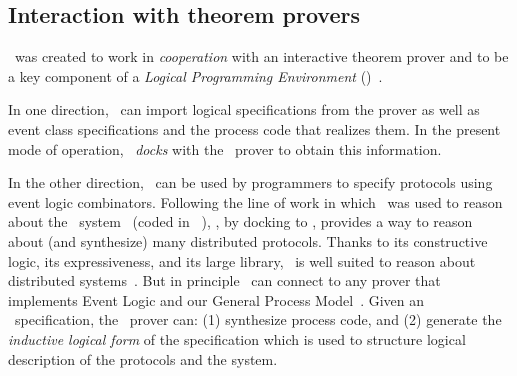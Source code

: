 \documentclass[final]{article}
\begin{document}
\subsection{Interaction with theorem provers}

\eml\ was created to work in \emph{cooperation} with an interactive
theorem prover and to be a key component of a \emph{Logical
  Programming Environment} (\LPE)~\cite{Allen+al:2006}.

In one direction, \eml\ can import logical specifications from the
prover as well as event class specifications and the process code that
realizes them.
%
In the present mode of operation, \eml\ \emph{docks} with the
\nuprl\ prover to obtain this information.

In the other direction, \eml\ can be used by programmers to specify
protocols using event logic combinators.
%
Following the line of work in which \nuprl\ was used to reason about
the
\ENSEMBLE\ system~\cite{Hayden:98a,Birman+al:2000a,Kreitz+Hayden+Hickey:1998,Liu+al:1999}
(coded in \OCAML~\cite{ma:Caml00a}), \eml, by docking to \nuprl,
provides a way to reason about (and synthesize) many distributed
protocols.
%
Thanks to its constructive logic, its expressiveness, and its large
library, \nuprl\ is well suited to reason about distributed
systems~\cite{Bickford+Kreitz+VanRenesse:2001}.
%
But in principle \eml\ can connect to any prover that implements Event
Logic and our General Process
Model~\cite{Bickford+Constable+Guaspari:2011a}.
%
Given an \eml\ specification, the \nuprl\ prover can: (1) synthesize
process code, and (2) generate the \emph{inductive logical form} of
the specification which is used to structure logical description of
the protocols and the system.
\end{document}
